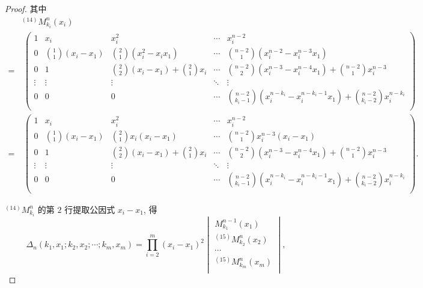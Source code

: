 \documentclass[color=black,device=normal,lang=cn,mode=geye]{elegantnote}
\begin{document}
\begin{landscape}
\begin{proof}
    其中
    \begin{align*}
        & ^{(14)}M_{k_i}^n(x_i) \\
        = & \ \begin{pmatrix}
            1 & x_i & x_i^2 & \cdots & x_i^{n-2} \\[4pt]
            0 & \binom{1}{1}(x_i-x_1) & \binom{2}{1}(x_i^2-x_ix_1) & \cdots & \binom{n-2}{1}(x_i^{n-2}-x_i^{n-3}x_1) \\[10pt]
            0 & 1 & \binom{2}{2}(x_i-x_1)+\binom{2}{1}x_i & \cdots & \binom{n-2}{2}(x_i^{n-3}-x_i^{n-4}x_1)+\binom{n-2}{1}x_i^{n-3} \\
            \vdots & \vdots & \vdots & \ddots & \vdots \\[4pt]
            0 & 0 & 0 & \cdots & \binom{n-2}{k_i-1}(x_i^{n-k_i}-x_i^{n-k_i-1}x_1)+\binom{n-2}{k_i-2}x_i^{n-k_i} \\
        \end{pmatrix} \\
        = & \ \begin{pmatrix}
            1 & x_i & x_i^2 & \cdots & x_i^{n-2} \\[4pt]
            0 & \binom{1}{1}(x_i-x_1) & \binom{2}{1}x_i(x_i-x_1) & \cdots & \binom{n-2}{1}x_i^{n-3}(x_i-x_1) \\[10pt]
            0 & 1 & \binom{2}{2}(x_i-x_1)+\binom{2}{1}x_i & \cdots & \binom{n-2}{2}(x_i^{n-3}-x_i^{n-4}x_1)+\binom{n-2}{1}x_i^{n-3} \\
            \vdots & \vdots & \vdots & \ddots & \vdots \\[4pt]
            0 & 0 & 0 & \cdots & \binom{n-2}{k_i-1}(x_i^{n-k_i}-x_i^{n-k_i-1}x_1)+\binom{n-2}{k_i-2}x_i^{n-k_i} \\
        \end{pmatrix}.
    \end{align*}

    $^{(14)}M_{k_i}^n$ 的第 $2$ 行提取公因式 $x_i-x_1$, 得
    \[\Delta_n(k_1,x_1;k_2,x_2;\cdots;k_m,x_m)=\prod\limits_{i=2}^m(x_i-x_1)^{2}\begin{vmatrix}
        M_{k_1}^{n-1}(x_1) \\
        ^{(15)}M_{k_2}^n(x_2) \\
        \cdots \\
        ^{(15)}M_{k_m}^n(x_m) \\
    \end{vmatrix},\]


\end{proof}
\end{landscape}
\end{document}
